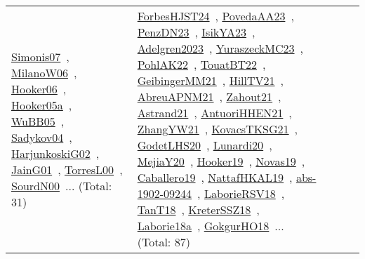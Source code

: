 {\begin{longtable}{lp{3cm}>{\raggedright\arraybackslash}p{6cm}>{\raggedright\arraybackslash}p{6cm}>{\raggedright\arraybackslash}p{8cm}}
\href{../works/Simonis07.pdf}{Simonis07}~\cite{Simonis07}, \href{../works/MilanoW06.pdf}{MilanoW06}~\cite{MilanoW06}, \href{../works/Hooker06.pdf}{Hooker06}~\cite{Hooker06}, \href{../works/Hooker05a.pdf}{Hooker05a}~\cite{Hooker05a}, \href{../works/WuBB05.pdf}{WuBB05}~\cite{WuBB05}, \href{../works/Sadykov04.pdf}{Sadykov04}~\cite{Sadykov04}, \href{../works/HarjunkoskiG02.pdf}{HarjunkoskiG02}~\cite{HarjunkoskiG02}, \href{../works/JainG01.pdf}{JainG01}~\cite{JainG01}, \href{../works/TorresL00.pdf}{TorresL00}~\cite{TorresL00}, \href{../works/SourdN00.pdf}{SourdN00}~\cite{SourdN00}... (Total: 31) & \href{../works/ForbesHJST24.pdf}{ForbesHJST24}~\cite{ForbesHJST24}, \href{../works/PovedaAA23.pdf}{PovedaAA23}~\cite{PovedaAA23}, \href{../works/PenzDN23.pdf}{PenzDN23}~\cite{PenzDN23}, \href{../works/IsikYA23.pdf}{IsikYA23}~\cite{IsikYA23}, \href{../works/Adelgren2023.pdf}{Adelgren2023}~\cite{Adelgren2023}, \href{../works/YuraszeckMC23.pdf}{YuraszeckMC23}~\cite{YuraszeckMC23}, \href{../works/PohlAK22.pdf}{PohlAK22}~\cite{PohlAK22}, \href{../works/TouatBT22.pdf}{TouatBT22}~\cite{TouatBT22}, \href{../works/GeibingerMM21.pdf}{GeibingerMM21}~\cite{GeibingerMM21}, \href{../works/HillTV21.pdf}{HillTV21}~\cite{HillTV21}, \href{../works/AbreuAPNM21.pdf}{AbreuAPNM21}~\cite{AbreuAPNM21}, \href{../works/Zahout21.pdf}{Zahout21}~\cite{Zahout21}, \href{../works/Astrand21.pdf}{Astrand21}~\cite{Astrand21}, \href{../works/AntuoriHHEN21.pdf}{AntuoriHHEN21}~\cite{AntuoriHHEN21}, \href{../works/ZhangYW21.pdf}{ZhangYW21}~\cite{ZhangYW21}, \href{../works/KovacsTKSG21.pdf}{KovacsTKSG21}~\cite{KovacsTKSG21}, \href{../works/GodetLHS20.pdf}{GodetLHS20}~\cite{GodetLHS20}, \href{../works/Lunardi20.pdf}{Lunardi20}~\cite{Lunardi20}, \href{../works/MejiaY20.pdf}{MejiaY20}~\cite{MejiaY20}, \href{../works/Hooker19.pdf}{Hooker19}~\cite{Hooker19}, \href{../works/Novas19.pdf}{Novas19}~\cite{Novas19}, \href{../works/Caballero19.pdf}{Caballero19}~\cite{Caballero19}, \href{../works/NattafHKAL19.pdf}{NattafHKAL19}~\cite{NattafHKAL19}, \href{../works/abs-1902-09244.pdf}{abs-1902-09244}~\cite{abs-1902-09244}, \href{../works/LaborieRSV18.pdf}{LaborieRSV18}~\cite{LaborieRSV18}, \href{../works/TanT18.pdf}{TanT18}~\cite{TanT18}, \href{../works/KreterSSZ18.pdf}{KreterSSZ18}~\cite{KreterSSZ18}, \href{../works/Laborie18a.pdf}{Laborie18a}~\cite{Laborie18a}, \href{../works/GokgurHO18.pdf}{GokgurHO18}~\cite{GokgurHO18}... (Total: 87)\\

\end{longtable}}
